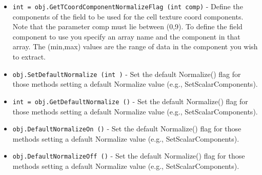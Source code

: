 \begin{itemize}
\item  \verb|int = obj.GetTCoordComponentNormalizeFlag (int comp)| -  Define the components of the field to be used for the cell texture coord
 components.  Note that the parameter comp must lie between (0,9). To
 define the field component to use you specify an array name and the
 component in that array. The (min,max) values are the range of data in
 the component you wish to extract.

\item  \verb|obj.SetDefaultNormalize (int )| -  Set the default Normalize() flag for those methods setting a default
 Normalize value (e.g., SetScalarComponents).

\item  \verb|int = obj.GetDefaultNormalize ()| -  Set the default Normalize() flag for those methods setting a default
 Normalize value (e.g., SetScalarComponents).

\item  \verb|obj.DefaultNormalizeOn ()| -  Set the default Normalize() flag for those methods setting a default
 Normalize value (e.g., SetScalarComponents).

\item  \verb|obj.DefaultNormalizeOff ()| -  Set the default Normalize() flag for those methods setting a default
 Normalize value (e.g., SetScalarComponents).

\end{itemize}
